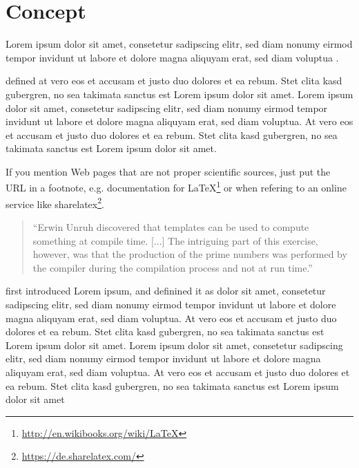 \documentclass[12pt,a4paper]{article}
\title{\titlename}
\author{ \authorname\\ \scriptsize \authormail \\ \scriptsize \address }
\date{\exposedate}
\begin{document}

\maketitle

\section*{Concept}

Lorem ipsum dolor sit amet, consetetur sadipscing elitr, sed diam nonumy eirmod tempor invidunt ut labore et dolore magna aliquyam erat, sed diam voluptua \autocite[]{McConnell:2004:CCS:1096143}.

\textcite[]{Vandevoorde:2002} defined at vero eos et accusam et justo duo dolores et ea rebum. Stet clita kasd gubergren, no sea takimata sanctus est Lorem ipsum dolor sit amet. Lorem ipsum dolor sit amet, consetetur sadipscing elitr, sed diam nonumy eirmod tempor invidunt ut labore et dolore magna aliquyam erat, sed diam voluptua. At vero eos et accusam et justo duo dolores et ea rebum. Stet clita kasd gubergren, no sea takimata sanctus est Lorem ipsum dolor sit amet.

If you mention Web pages that are not proper scientific sources, just put the URL in a footnote, e.g. documentation for \LaTeX\footnote{\url{http://en.wikibooks.org/wiki/LaTeX}}
or when refering to an online service like  sharelatex\footnote{\url{https://de.sharelatex.com/}}.


\begin{quote}
``Erwin Unruh discovered that templates can be used to compute
something at compile time. [...] The intriguing part of this exercise, however, was that the production of the prime numbers was performed by the compiler during the compilation process and not at run time.''
\autocite[305]{Vandevoorde:2002}
\end{quote}

\textcite[]{Vandevoorde:2002} first introduced Lorem ipsum, and definined it as dolor sit amet, consetetur sadipscing elitr, sed diam nonumy eirmod tempor invidunt ut labore et dolore magna aliquyam erat, sed diam voluptua. At vero eos et accusam et justo duo dolores et ea rebum. Stet clita kasd gubergren, no sea takimata sanctus est Lorem ipsum dolor sit amet. Lorem ipsum dolor sit amet, consetetur sadipscing elitr, sed diam nonumy eirmod tempor invidunt ut labore et dolore magna aliquyam erat, sed diam voluptua. At vero eos et accusam et justo duo dolores et ea rebum. Stet clita kasd gubergren, no sea takimata sanctus est Lorem ipsum dolor sit amet 
\end{document}
